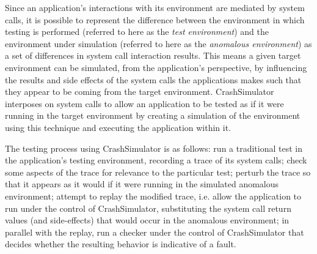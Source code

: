 Since an application's interactions with its environment are mediated by system calls,
it is possible to represent the difference between the environment in which testing is performed (referred to here
as the {\em test environment}) and the environment under simulation (referred to here as the {\em anomalous environment})
as a set of differences in system call interaction results. 
This means
a given target environment can be simulated, from the application's perspective, by influencing the results and side
effects of the system calls the applications makes such that they appear to be coming from the target environment.
CrashSimulator interposes on system calls to allow an application to
be tested as if it were running in the target environment by creating a simulation of
the environment using this technique and executing the application within it.

The testing process using CrashSimulator is as follows:
	run a traditional test in the application's testing environment, recording a trace of its system calls;
	check some aspects of the trace for relevance to the particular test;
		perturb the trace so that it appears as it would if it were running in the simulated anomalous environment;
		attempt to replay the modified trace, i.e. allow the application to run under the control of CrashSimulator, substituting the system call return values (and side-effects) that would occur in the anomalous environment;
		in parallel with the replay, run a checker under the control of CrashSimulator that decides whether the resulting behavior is indicative of a fault.

